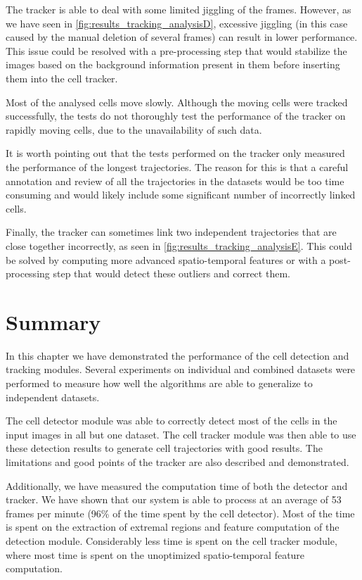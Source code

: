 	The tracker is able to deal with some limited jiggling of the frames. However, as we have seen in \cref{fig:results_tracking_analysisD}, excessive jiggling (in this case caused by the manual deletion of several frames) can result in lower performance. This issue could be resolved with a pre-processing step that would stabilize the images based on the background information present in them before inserting them into the cell tracker.
	
	Most of the analysed cells move slowly. Although the moving cells were tracked successfully, the tests do not thoroughly test the performance of the tracker on rapidly moving cells, due to the unavailability of such data.
	
	It is worth pointing out that the tests performed on the tracker only measured the performance of the longest trajectories. The reason for this is that a careful annotation and review of all the trajectories in the datasets would be too time consuming and would likely include some significant number of incorrectly linked cells.
	
	Finally, the tracker can sometimes link two independent trajectories that are close together incorrectly, as seen in \cref{fig:results_tracking_analysisE}. This could be solved by computing more advanced spatio-temporal features or with a post-processing step that would detect these outliers and correct them.
	
\section{Summary}
	\label{sec:results_summary}
	
	In this chapter we have demonstrated the performance of the cell detection and tracking modules. Several experiments on individual and combined datasets were performed to measure how well the algorithms are able to generalize to independent datasets.
	
	The cell detector module was able to correctly detect most of the cells in the input images in all but one dataset. The cell tracker module was then able to use these detection results to generate cell trajectories with good results. The limitations and good points of the tracker are also described and demonstrated.

	Additionally, we have measured the computation time of both the detector and tracker. We have shown that our system is able to process at an average of 53 frames per minute (96\% of the time spent by the cell detector). Most of the time is spent on the extraction of extremal regions and feature computation of the detection module. Considerably less time is spent on the cell tracker module, where most time is spent on the unoptimized spatio-temporal feature computation.